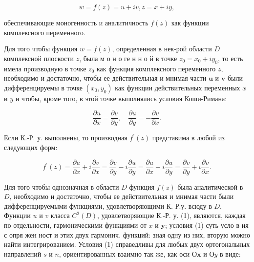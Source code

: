 \documentclass[10pt]{article}
\begin{document}
\[

w=f(z)=u+i v, z=x+i y,

\]



обеспечивающие моногенность и аналитичность $f(z)$ как функции комплексного переменного.



Для того чтобы функция $w=f(z)$, определенная в нек-рой области $D$ комплексной плоскости $z$, была м о н о ге н н о й в точке $z_{0}=x_{0}+i y_{0}$, то есть имела производную в точке $z_{0}$ как функция комплексного переменного $z$, необходимо и достаточно, чтобы ее действительная и мнимая части $\boldsymbol{u}$ и $\boldsymbol{v}$ были дифференцируемы в точке $\left(x_{0}, y_{0}\right)$ как функции действительных переменных $x$ и $y$ и чтобы, кроме того, в этой точке выполнялись условия Коши-Римана:



\[

\frac{\partial u}{\partial x}=\frac{\partial v}{\partial y}, \quad \frac{\partial u}{\partial y}=-\frac{\partial v}{\partial x} .

\]



Если К.-Р. у. выполнены, то производная $f^{\prime}(z)$ представима в любой из следующих форм:



\[

f^{\prime}(z)=\frac{\partial u}{\partial x}+i \frac{\partial v}{\partial x}=\frac{\partial v}{\partial y}-i \frac{\partial u}{\partial y}=\frac{\partial u}{\partial x}-i \frac{\partial u}{\partial y}=\frac{\partial v}{\partial y}+i \frac{\partial v}{\partial x} .

\]



Для того чтобы однозначная в области $D$ функция $f(z)$ была аналитической в $D$, необходимо и достаточно, чтобы ее действительная и мнимая части были дифференцируемыми функциями, удовлетворяющими К.-Р.у. всюду в $D$. Функции $u$ и $v$ класса $C^{2}(D)$, удовлетворяющие К.-Р. у. (1), являются, каждая по отдельности, гармоническими функциями от $x$ и $\boldsymbol{y}$; условия (1) суть усло в ия с опря жен ност и этих двух гармонич. функций: зная одну из них, вторую можно найти интегрированием. Условия (1) справедливы для любых двух ортогональных направлений $s$ и $n$, ориентированных взаимно так же, как оси $О \boldsymbol{x}$ и $О y$ в виде:
\end{document}
